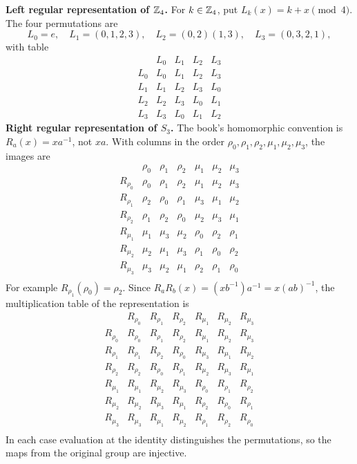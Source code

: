 \textbf{Left regular representation of $\mathbb{Z}_4$.} For $k\in\mathbb{Z}_4$, put $L_k(x)=k+x\pmod4$. The four permutations are
\[L_0=e,\quad L_1=(0,1,2,3),\quad L_2=(0,2)(1,3),\quad L_3=(0,3,2,1),\]
with table
\[\begin{array}{c|cccc}&L_0&L_1&L_2&L_3\\\hline
L_0&L_0&L_1&L_2&L_3\\L_1&L_1&L_2&L_3&L_0\\
L_2&L_2&L_3&L_0&L_1\\L_3&L_3&L_0&L_1&L_2
\end{array}\]
\textbf{Right regular representation of $S_3$.} The book's homomorphic convention is $R_a(x)=xa^{-1}$, not $xa$. With columns in the order $\rho_0,\rho_1,\rho_2,\mu_1,\mu_2,\mu_3$, the images are
\[\begin{array}{c|cccccc}&\rho_0&\rho_1&\rho_2&\mu_1&\mu_2&\mu_3\\\hline
R_{\rho_0} & \rho_0 & \rho_1 & \rho_2 & \mu_1 & \mu_2 & \mu_3\\
R_{\rho_1} & \rho_2 & \rho_0 & \rho_1 & \mu_3 & \mu_1 & \mu_2\\
R_{\rho_2} & \rho_1 & \rho_2 & \rho_0 & \mu_2 & \mu_3 & \mu_1\\
R_{\mu_1} & \mu_1 & \mu_3 & \mu_2 & \rho_0 & \rho_2 & \rho_1\\
R_{\mu_2} & \mu_2 & \mu_1 & \mu_3 & \rho_1 & \rho_0 & \rho_2\\
R_{\mu_3} & \mu_3 & \mu_2 & \mu_1 & \rho_2 & \rho_1 & \rho_0\\\end{array}\]
For example $R_{\rho_1}(\rho_0)=\rho_2$. Since
$R_aR_b(x)=(xb^{-1})a^{-1}=x(ab)^{-1}$, the multiplication table of the representation is
\[\begin{array}{c|cccccc}&R_{\rho_0}&R_{\rho_1}&R_{\rho_2}&R_{\mu_1}&R_{\mu_2}&R_{\mu_3}\\\hline
R_{\rho_0} & R_{\rho_0} & R_{\rho_1} & R_{\rho_2} & R_{\mu_1} & R_{\mu_2} & R_{\mu_3}\\
R_{\rho_1} & R_{\rho_1} & R_{\rho_2} & R_{\rho_0} & R_{\mu_3} & R_{\mu_1} & R_{\mu_2}\\
R_{\rho_2} & R_{\rho_2} & R_{\rho_0} & R_{\rho_1} & R_{\mu_2} & R_{\mu_3} & R_{\mu_1}\\
R_{\mu_1} & R_{\mu_1} & R_{\mu_2} & R_{\mu_3} & R_{\rho_0} & R_{\rho_1} & R_{\rho_2}\\
R_{\mu_2} & R_{\mu_2} & R_{\mu_3} & R_{\mu_1} & R_{\rho_2} & R_{\rho_0} & R_{\rho_1}\\
R_{\mu_3} & R_{\mu_3} & R_{\mu_1} & R_{\mu_2} & R_{\rho_1} & R_{\rho_2} & R_{\rho_0}\\\end{array}\]
In each case evaluation at the identity distinguishes the permutations, so the maps from the original group are injective.


